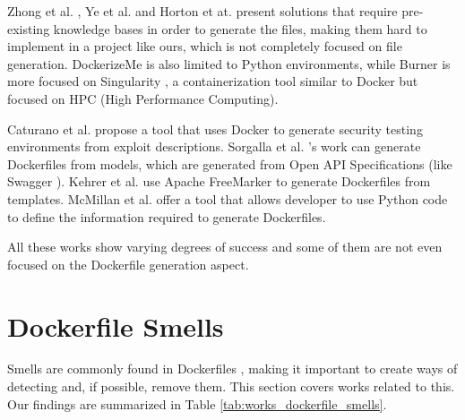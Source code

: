 Zhong et al. \cite{zhongBurnerRecipeAutomatic2022}, Ye et al. \cite{yeDockerGenKnowledgeGraph2021} and Horton et at. \cite{hortonDockerizeMeAutomaticInference2019} present solutions that require pre-existing knowledge bases in order to generate the files, making them hard to implement in a project like ours, which is not completely focused on file generation. DockerizeMe is also limited to Python environments, while Burner is more focused on Singularity \cite{Apptainer}, a containerization tool similar to Docker but focused on HPC (High Performance Computing).

Caturano et al. \cite{caturanoExploitWP2DockerPlatformAutomating2022} propose a tool that uses Docker to generate security testing environments from exploit descriptions. Sorgalla et al. \cite{sorgallaApplyingModelDrivenEngineering2021}'s work can generate Dockerfiles from models, which are generated from Open API Specifications (like Swagger \cite{Swagger}). Kehrer et al. \cite{kehrerContainerBasedModuleIsolation2019} use Apache FreeMarker \cite{ApacheFreeMarker} to generate Dockerfiles from templates. McMillan et al. \cite{mcmillanMAKINGCONTAINERSEASIER} offer a tool that allows developer to use Python code to define the information required to generate Dockerfiles.

All these works show varying degrees of success and some of them are not even focused on the Dockerfile generation aspect.

\section{Dockerfile Smells} \label{sec:dockerfile_smells}

Smells are commonly found in Dockerfiles \cite{wuCharacterizingOccurrenceDockerfile2020}, making it important to create ways of detecting and, if possible, remove them. This section covers works related to this. Our findings are summarized in Table \ref{tab:works_dockerfile_smells}.

